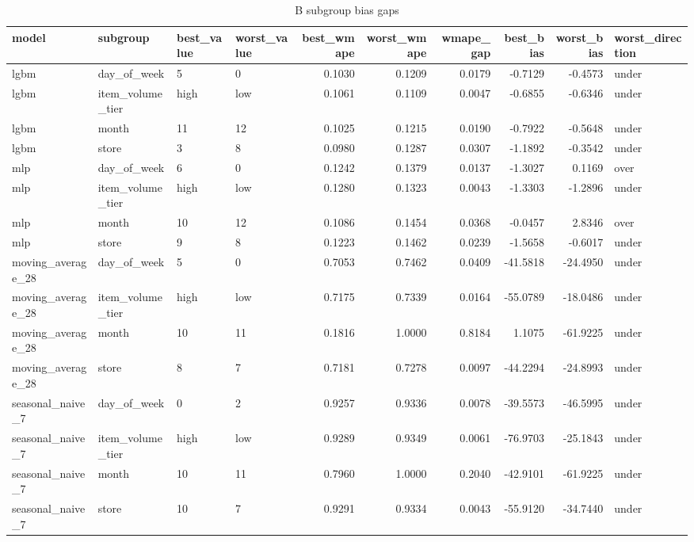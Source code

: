 \begin{table}
\caption{B subgroup bias gaps}
\label{tab:bias-gaps-B}
\begin{tabular}{llllrrrrrl}
\toprule
model & subgroup & best\_value & worst\_value & best\_wmape & worst\_wmape & wmape\_gap & best\_bias & worst\_bias & worst\_direction \\
\midrule
lgbm & day\_of\_week & 5 & 0 & 0.1030 & 0.1209 & 0.0179 & -0.7129 & -0.4573 & under \\
lgbm & item\_volume\_tier & high & low & 0.1061 & 0.1109 & 0.0047 & -0.6855 & -0.6346 & under \\
lgbm & month & 11 & 12 & 0.1025 & 0.1215 & 0.0190 & -0.7922 & -0.5648 & under \\
lgbm & store & 3 & 8 & 0.0980 & 0.1287 & 0.0307 & -1.1892 & -0.3542 & under \\
mlp & day\_of\_week & 6 & 0 & 0.1242 & 0.1379 & 0.0137 & -1.3027 & 0.1169 & over \\
mlp & item\_volume\_tier & high & low & 0.1280 & 0.1323 & 0.0043 & -1.3303 & -1.2896 & under \\
mlp & month & 10 & 12 & 0.1086 & 0.1454 & 0.0368 & -0.0457 & 2.8346 & over \\
mlp & store & 9 & 8 & 0.1223 & 0.1462 & 0.0239 & -1.5658 & -0.6017 & under \\
moving\_average\_28 & day\_of\_week & 5 & 0 & 0.7053 & 0.7462 & 0.0409 & -41.5818 & -24.4950 & under \\
moving\_average\_28 & item\_volume\_tier & high & low & 0.7175 & 0.7339 & 0.0164 & -55.0789 & -18.0486 & under \\
moving\_average\_28 & month & 10 & 11 & 0.1816 & 1.0000 & 0.8184 & 1.1075 & -61.9225 & under \\
moving\_average\_28 & store & 8 & 7 & 0.7181 & 0.7278 & 0.0097 & -44.2294 & -24.8993 & under \\
seasonal\_naive\_7 & day\_of\_week & 0 & 2 & 0.9257 & 0.9336 & 0.0078 & -39.5573 & -46.5995 & under \\
seasonal\_naive\_7 & item\_volume\_tier & high & low & 0.9289 & 0.9349 & 0.0061 & -76.9703 & -25.1843 & under \\
seasonal\_naive\_7 & month & 10 & 11 & 0.7960 & 1.0000 & 0.2040 & -42.9101 & -61.9225 & under \\
seasonal\_naive\_7 & store & 10 & 7 & 0.9291 & 0.9334 & 0.0043 & -55.9120 & -34.7440 & under \\
\bottomrule
\end{tabular}
\end{table}
